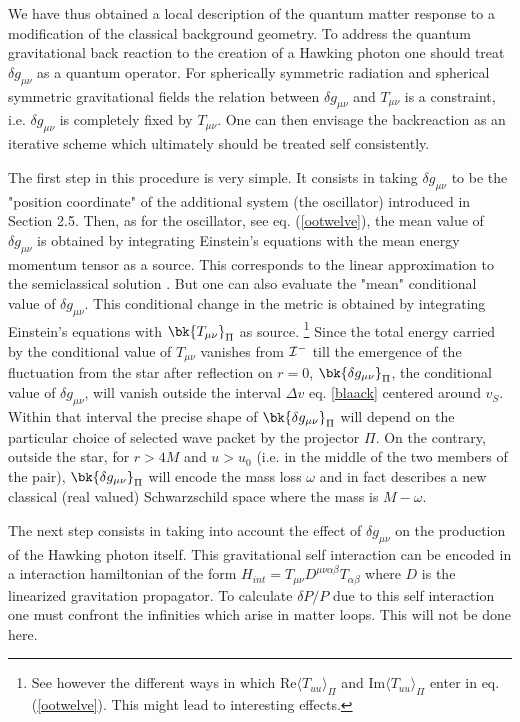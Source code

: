 \documentclass[12pt]{article}
\begin{document}
We have thus obtained a local description of the quantum matter response to a
modification of the classical background geometry. To address the quantum
gravitational back reaction to the creation of a Hawking photon one should
treat
$\delta g_{\mu\nu}$ as a quantum operator\cite{THooft,bmpps}.
For spherically symmetric radiation and
spherical symmetric gravitational fields the relation between $\delta
g_{\mu\nu}$ and $T_{\mu\nu}$ is a constraint, i.e.
$\delta g_{\mu\nu}$ is completely fixed by $T_{\mu\nu}$. One can then envisage
the backreaction as an iterative scheme which ultimately should be treated self
consistently.

The first step in this procedure is very simple. It consists in
taking $\delta g_{\mu\nu}$ to
be the "position coordinate" of the additional system (the
oscillator) introduced in Section 2.5.
Then, as for the oscillator, see eq. (\ref{ootwelve}),
the mean value of $\delta g_{\mu\nu}$ is obtained by integrating
Einstein's equations
with the mean energy momentum tensor as a source.
This corresponds to the linear approximation to the semiclassical solution
\cite{Massar2}.
But one can also evaluate the "mean" conditional
value of $\delta g_{\mu\nu}$. This conditional
change in the metric
 is obtained by integrating Einstein's equations
with $\bk{T_{\mu\nu}}_{\Pi}$ as source.
\footnote{See however the different ways in which Re$\langle T_{uu}\rangle_\Pi$
and Im$\langle T_{uu}\rangle_\Pi$ enter in eq. (\ref{ootwelve}). This might
lead to interesting effects.}
 Since the total energy carried by the conditional
value of $T_{\mu\nu}$
vanishes from ${\cal I}^-$ till the emergence of the fluctuation from the star
after reflection on $r=0$, $\bk{\delta g_{\mu\nu}}_{\Pi}$, the conditional
value of $\delta g_{\mu\nu}$, will vanish
outside the interval $\Delta v$ eq. \ref{blaack} centered around $v_S$.
Within that interval the precise
shape of  $\bk{\delta g_{\mu\nu}}_{\Pi}$
 will depend on the particular choice of
selected wave packet by the projector ${\Pi}$.
On the contrary, outside the star, for $r>4M$ and
$u> u_0$ (i.e. in the middle
of the two members of the pair), $\bk{\delta g_{\mu\nu}}_{\Pi}$ will encode the
mass loss
$\omega$ and in fact describes a new classical (real valued)
Schwarzschild space where the mass is
$M-\omega$.

The next step consists in taking
 into account the effect of $\delta g_{\mu\nu}$
on the production of the Hawking photon itself. This gravitational self
interaction can be encoded in
 a interaction
hamiltonian of the form $H_{int} = T_{\mu \nu} D^{\mu \nu
\alpha\beta}T_{\alpha\beta}$ where $D$ is the linearized gravitation
propagator.
To calculate $\delta P/P$ due to this self interaction one must confront the
infinities which arise in matter loops. This will not be done here.
\end{document}
